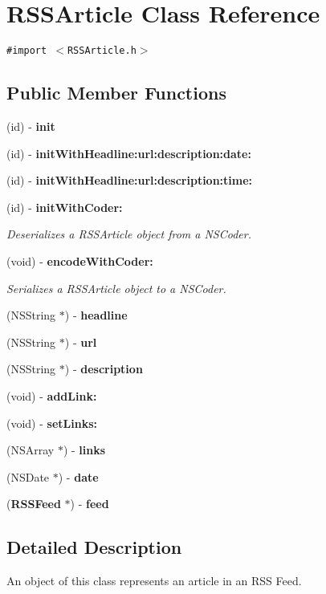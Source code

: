 \section{RSSArticle Class Reference}
\label{interfaceRSSArticle}
{\tt \#import $<$RSSArticle.h$>$}

\subsection*{Public Member Functions}
\begin{CompactItemize}
\item 
(id) - {\bf init}
\item 
(id) - {\bf init\-With\-Headline:url:description:date:}
\item 
(id) - {\bf init\-With\-Headline:url:description:time:}
\item 
(id) - {\bf init\-With\-Coder:}\label{interfaceRSSArticle_a4}

\begin{CompactList}\small\item\em Deserializes a RSSArticle object from a NSCoder. \item\end{CompactList}\item 
(void) - {\bf encode\-With\-Coder:}\label{interfaceRSSArticle_a5}

\begin{CompactList}\small\item\em Serializes a RSSArticle object to a NSCoder. \item\end{CompactList}\item 
(NSString $\ast$) - {\bf headline}
\item 
(NSString $\ast$) - {\bf url}
\item 
(NSString $\ast$) - {\bf description}
\item 
(void) - {\bf add\-Link:}
\item 
(void) - {\bf set\-Links:}
\item 
(NSArray $\ast$) - {\bf links}
\item 
(NSDate $\ast$) - {\bf date}
\item 
({\bf RSSFeed} $\ast$) - {\bf feed}
\end{CompactItemize}


\subsection{Detailed Description}
An object of this class represents an article in an RSS Feed.



